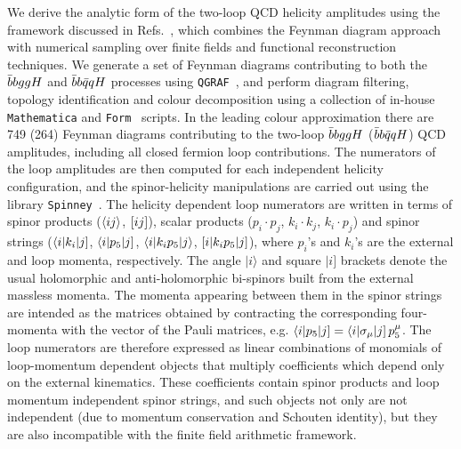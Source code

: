 \documentclass[main.tex]{subfiles}
\begin{document}
We derive the analytic form of the two-loop QCD helicity amplitudes using the framework discussed in Refs.~\cite{Badger:2021owl,Badger:2021imn}, which combines the Feynman diagram approach with numerical sampling over finite fields and functional reconstruction techniques. We generate a set of Feynman diagrams contributing to 
both the $\bar{b}bggH$ and $\bar{b}b\bar{q}qH$ processes using 
\texttt{QGRAF}~\cite{Nogueira:1991ex}, and perform diagram filtering, topology identification and colour decomposition using a collection of in-house \texttt{Mathematica} and \texttt{Form}~\cite{Kuipers:2012rf,Ruijl:2017dtg} scripts. 
In the leading colour approximation there are 749 (264) Feynman diagrams contributing to the two-loop $\bar{b}bggH$ ($\bar{b}b\bar{q}qH$) QCD amplitudes, including all closed fermion loop contributions.
The numerators of the loop amplitudes are then computed for each independent helicity configuration, and the spinor-helicity manipulations are carried out using the library \texttt{Spinney}~\cite{Cullen:2010jv}.
The helicity dependent loop numerators are written in terms of spinor products ($\langle ij\rangle$, $[ij]$), 
scalar products ($p_i\cdot p_j$, $k_i\cdot k_j$, $k_i \cdot p_j$) and 
spinor strings ($\langle i|k_i|j]$, $\langle i|p_5|j]$, $\langle i|k_i p_5|j\rangle$, $[i|k_i p_5|j]$), where $p_i$'s and $k_i$'s are the external and loop momenta, respectively. The angle $|i\rangle$ and square $|i]$ brackets denote the usual holomorphic and anti-holomorphic bi-spinors built from the external massless momenta. The momenta appearing between them in the spinor strings are intended as the matrices obtained by contracting the corresponding four-momenta with the vector of the Pauli matrices, e.g. $\langle i|p_5|j] = \langle i|\sigma_{\mu}|j] \, p^{\mu}_5$.
The loop numerators are therefore expressed as linear combinations of monomials of loop-momentum dependent objects 
that multiply coefficients which depend only on the external kinematics.
These coefficients contain spinor products and loop momentum independent spinor strings, 
and such objects not only are not independent  (due to momentum conservation and Schouten identity), 
but they are also incompatible with the finite field arithmetic framework.
\end{document}
